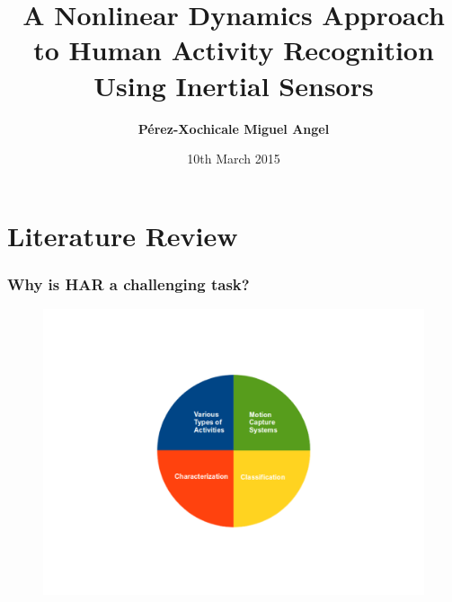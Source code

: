 \documentclass{beamer}
\title[A Nonlinear Dynamics Approach \\ to Human Activity Recognition Using Inertial Sensors]
{A Nonlinear Dynamics Approach to Human Activity Recognition Using Inertial Sensors}
\author[P\'erez-Xochicale Miguel Angel]
{   %
    \textbf{P\'erez-Xochicale Miguel Angel}
}
\institute[CVC-IIIA]
{   %

      \vspace{5mm}
    \begin{tabular}{c}
    Internal Research Conference Presentation \\
    EECE School
    \end{tabular}
}
\date[DEMO-2013]
{   %
     10th March 2015
}
\begin{document}
\frame{\titlepage}





\section{Literature Review}




\begin{frame}
	\frametitle{Why is HAR a challenging task?}
\vspace{-0.5cm}
\begin{figure}
 \includegraphics[scale=.3]{har00}
\vspace{-0.6cm}
\end{figure}
\end{frame}
\end{document}
